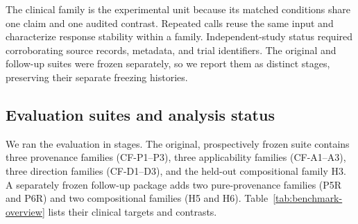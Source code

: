 \documentclass[11pt]{article}
\begin{document}
The clinical family is the experimental unit because its matched conditions share one claim and one audited contrast. Repeated calls reuse the same input and characterize response stability within a family. Independent-study status required corroborating source records, metadata, and trial identifiers. The original and follow-up suites were frozen separately, so we report them as distinct stages, preserving their separate freezing histories.

\subsection{Evaluation suites and analysis status}

We ran the evaluation in stages. The original, prospectively frozen suite contains three provenance families (CF-P1--P3), three applicability families (CF-A1--A3), three direction families (CF-D1--D3), and the held-out compositional family H3. A separately frozen follow-up package adds two pure-provenance families (P5R and P6R) and two compositional families (H5 and H6). Table~\ref{tab:benchmark-overview} lists their clinical targets and contrasts.
\end{document}
